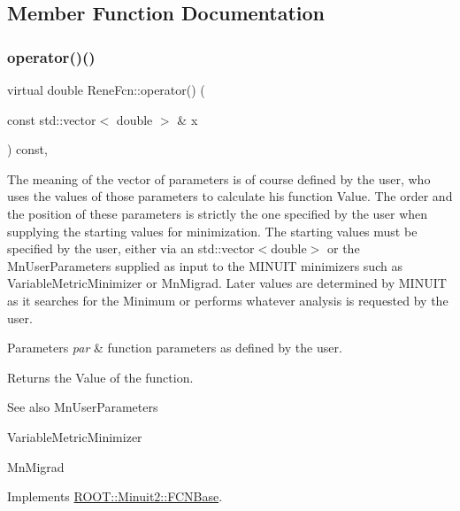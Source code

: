 \subsection{Member Function Documentation}
\mbox{\label{classReneFcn_a717a787ca09d586430bf5dc1d51b7ab1}} 
\subsubsection{\texorpdfstring{operator()()}{operator()()}}
{\footnotesize\ttfamily virtual double Rene\+Fcn\+::operator() (\begin{DoxyParamCaption}\item[{const std\+::vector$<$ double $>$ \&}]{x }\end{DoxyParamCaption}) const\hspace{0.3cm}{\ttfamily [inline]}, {\ttfamily [virtual]}}

The meaning of the vector of parameters is of course defined by the user, who uses the values of those parameters to calculate his function Value. The order and the position of these parameters is strictly the one specified by the user when supplying the starting values for minimization. The starting values must be specified by the user, either via an std\+::vector$<$double$>$ or the Mn\+User\+Parameters supplied as input to the M\+I\+N\+U\+IT minimizers such as Variable\+Metric\+Minimizer or Mn\+Migrad. Later values are determined by M\+I\+N\+U\+IT as it searches for the Minimum or performs whatever analysis is requested by the user.


\begin{DoxyParams}{Parameters}
{\em par} & function parameters as defined by the user.\\
\hline
\end{DoxyParams}
\begin{DoxyReturn}{Returns}
the Value of the function.
\end{DoxyReturn}
\begin{DoxySeeAlso}{See also}
Mn\+User\+Parameters 

Variable\+Metric\+Minimizer 

Mn\+Migrad 
\end{DoxySeeAlso}


Implements \mbox{\hyperlink{classROOT_1_1Minuit2_1_1FCNBase_ae4a86bd94d0d0f5ca6fc8f8ab2bb43cd}{R\+O\+O\+T\+::\+Minuit2\+::\+F\+C\+N\+Base}}.

